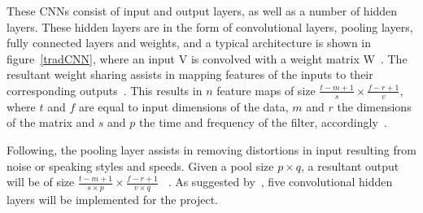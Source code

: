\documentclass[10pt,twocolumn]{witseiepaper}
\begin{document}
These CNNs consist of input and output layers, as well as a number of hidden layers. These hidden layers are in the form of convolutional layers, pooling layers, fully connected layers and weights, and a typical architecture is shown in figure~\ref{tradCNN}, where an input V is convolved with a weight matrix W~\cite{CNN}. The resultant weight sharing assists in mapping features of the inputs to their corresponding outputs~\cite{CNN}. This results in $n$ feature maps of size $\frac{t-m+1}{s} \times \frac{f-r+1}{v}$, where $t$ and $f$ are equal to input dimensions of the data, $m$ and $r$ the dimensions of the matrix and $s$ and $p$ the time and frequency of the filter, accordingly~\cite{CNN}.

Following, the pooling layer assists in removing distortions in input resulting from noise or speaking styles and speeds. Given a pool size $ p \times q$, a resultant output will be of size $\frac{t-m+1}{s\times p} \times \frac{f-r+1}{v\times q}$ ~\cite{CNN}.
As suggested by~\cite{RGB}, five convolutional hidden layers will be implemented for the project.
\end{document}
